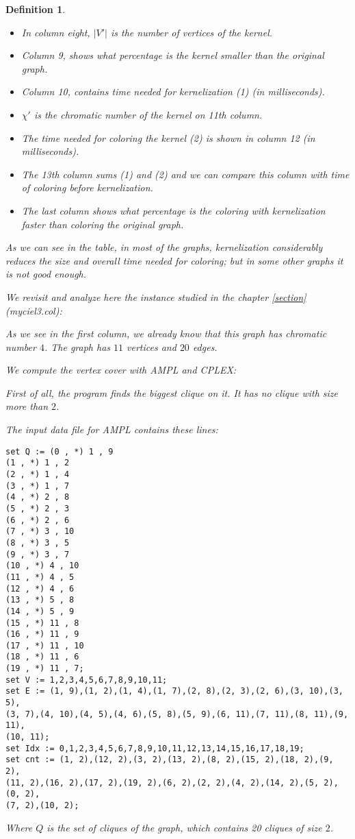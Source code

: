 \documentclass[12pt]{article}
\theoremstyle{slplain}
\newtheorem{defi}{Definition}[section]
\begin{document}
\begin{defi}
\begin{itemize}
\item In column eight, $|V'|$ is the number of vertices of the kernel. 

\item Column 9, shows what percentage is the kernel smaller than the original graph.

\item Column 10, contains time needed for kernelization (1) (in milliseconds).

\item $\chi'$ is the chromatic number of the kernel on 11th column. 

\item The time needed for coloring the kernel (2) is shown in column 12 (in milliseconds). 

\item The 13th column sums (1) and (2) and we can compare this column with time of coloring before kernelization.

\item The last column shows what percentage is the coloring with kernelization faster than coloring the original graph.
\end{itemize}

As we can see in the table, in most of the graphs, kernelization considerably reduces the size and overall time needed for coloring; but in some other graphs it is not good enough.

We revisit and analyze here the instance studied in the chapter \ref{section} (myciel3.col):
     
As we see in the first column, we already know that this graph has chromatic number $4$. The graph has $11$ vertices and $20$ edges. 

We compute the vertex cover with AMPL and CPLEX: 

First of all, the program finds the biggest clique on it. It has no clique with size more than $2$.

The input data file for AMPL contains these lines:
\newpage
{\small 
\begin{verbatim}
set Q := (0 , *) 1 , 9
(1 , *) 1 , 2
(2 , *) 1 , 4
(3 , *) 1 , 7
(4 , *) 2 , 8
(5 , *) 2 , 3
(6 , *) 2 , 6
(7 , *) 3 , 10
(8 , *) 3 , 5
(9 , *) 3 , 7
(10 , *) 4 , 10
(11 , *) 4 , 5
(12 , *) 4 , 6
(13 , *) 5 , 8
(14 , *) 5 , 9
(15 , *) 11 , 8
(16 , *) 11 , 9
(17 , *) 11 , 10
(18 , *) 11 , 6
(19 , *) 11 , 7;
set V := 1,2,3,4,5,6,7,8,9,10,11;
set E := (1, 9),(1, 2),(1, 4),(1, 7),(2, 8),(2, 3),(2, 6),(3, 10),(3, 5),
(3, 7),(4, 10),(4, 5),(4, 6),(5, 8),(5, 9),(6, 11),(7, 11),(8, 11),(9, 11),
(10, 11);
set Idx := 0,1,2,3,4,5,6,7,8,9,10,11,12,13,14,15,16,17,18,19;
set cnt := (1, 2),(12, 2),(3, 2),(13, 2),(8, 2),(15, 2),(18, 2),(9, 2),
(11, 2),(16, 2),(17, 2),(19, 2),(6, 2),(2, 2),(4, 2),(14, 2),(5, 2),(0, 2),
(7, 2),(10, 2);
\end{verbatim}
}
Where $Q$ is the set of cliques of the graph, which contains 20 cliques of size $2$.


\end{defi}
\end{document}
